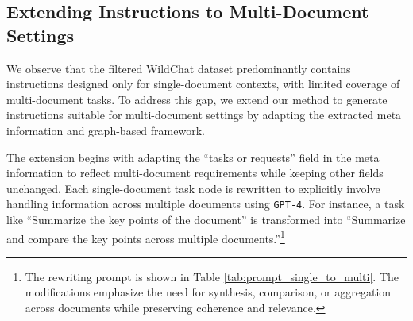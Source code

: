 

\subsection{Extending Instructions to Multi-Document Settings}
We observe that the filtered WildChat dataset predominantly contains instructions designed only for single-document contexts, with limited coverage of multi-document tasks. To address this gap, we extend our method to generate instructions suitable for multi-document settings by adapting the extracted meta information and graph-based framework.

The extension begins with adapting the ``tasks or requests'' field in the meta information to reflect multi-document requirements while keeping other fields unchanged. 
Each single-document task node is rewritten to explicitly involve handling information across multiple documents using {\tt GPT-4}.
For instance, a task like ``Summarize the key points of the document'' is transformed into ``Summarize and compare the key points across multiple documents.''\footnote{The rewriting prompt is shown in Table \ref{tab:prompt_single_to_multi}. The modifications emphasize the need for synthesis, comparison, or aggregation across documents while preserving coherence and relevance. }

